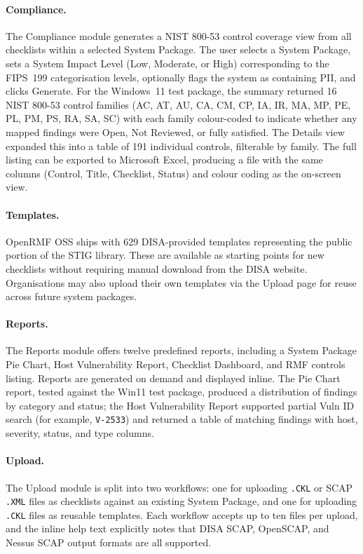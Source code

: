 \paragraph{Compliance.}
The Compliance module generates a NIST 800-53 control coverage view from
all checklists within a selected System Package. The user selects a System
Package, sets a System Impact Level (Low, Moderate, or High) corresponding
to the FIPS~199 categorisation levels, optionally flags the system as
containing PII, and clicks Generate. For the Windows~11 test package, the
summary returned 16 NIST 800-53 control families (AC, AT, AU, CA, CM, CP,
IA, IR, MA, MP, PE, PL, PM, PS, RA, SA, SC) with each family colour-coded
to indicate whether any mapped findings were Open, Not Reviewed, or fully
satisfied. The Details view expanded this into a table of 191 individual
controls, filterable by family. The full listing can be exported to
Microsoft Excel, producing a file with the same columns (Control, Title,
Checklist, Status) and colour coding as the on-screen view.

\paragraph{Templates.}
OpenRMF OSS ships with 629 DISA-provided templates representing the public
portion of the STIG library. These are available as starting points for new
checklists without requiring manual download from the DISA website.
Organisations may also upload their own templates via the Upload page for
reuse across future system packages.

\paragraph{Reports.}
The Reports module offers twelve predefined reports, including a System
Package Pie Chart, Host Vulnerability Report, Checklist Dashboard, and RMF
controls listing. Reports are generated on demand and displayed inline. The
Pie Chart report, tested against the Win11 test package, produced a
distribution of findings by category and status; the Host Vulnerability
Report supported partial Vuln ID search (for example, \texttt{V-2533})
and returned a table of matching findings with host, severity, status, and
type columns.

\paragraph{Upload.}
The Upload module is split into two workflows: one for uploading
\texttt{.CKL} or SCAP \texttt{.XML} files as checklists against an existing
System Package, and one for uploading \texttt{.CKL} files as reusable
templates. Each workflow accepts up to ten files per upload, and the
inline help text explicitly notes that DISA SCAP, OpenSCAP, and Nessus SCAP
output formats are all supported.

